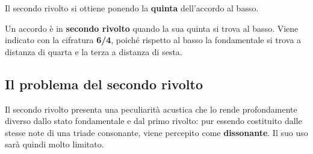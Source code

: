 Il secondo rivolto si ottiene ponendo la \textbf{quinta} dell'accordo al basso.

\begin{definizione}
	\label{def:secondo_rivolto}
	Un accordo è in \textbf{secondo rivolto} quando la sua quinta si trova al basso. Viene indicato con la cifratura \textbf{6/4}, poiché rispetto al basso la fondamentale si trova a distanza di quarta e la terza a distanza di sesta.
\end{definizione}

\begin{esempio}
	\label{ex:secondo_rivolto_triadi}
\end{esempio}

\subsection{Il problema del secondo rivolto}
\label{subsec:problema_secondo_rivolto}

Il secondo rivolto presenta una peculiarità acustica che lo rende profondamente diverso dallo stato fondamentale e dal primo rivolto: pur essendo costituito dalle stesse note di una triade consonante, viene percepito come \textbf{dissonante}. Il suo uso sarà quindi molto limitato.

